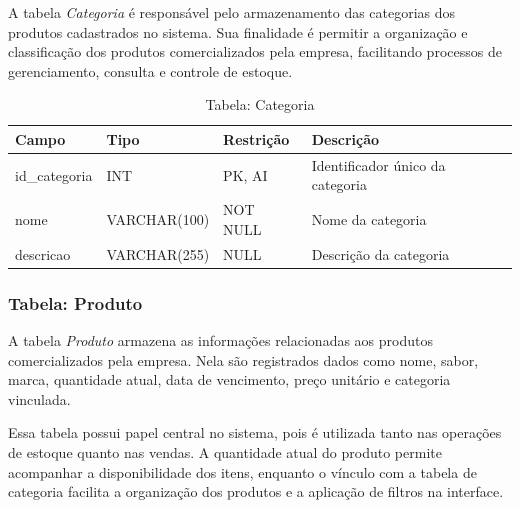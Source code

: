 A tabela \textit{Categoria} é responsável pelo armazenamento das categorias dos produtos cadastrados no sistema. Sua finalidade é permitir a organização e classificação dos produtos comercializados pela empresa, facilitando processos de gerenciamento, consulta e controle de estoque.

\begin{table}[H]
\centering
\begin{tabular}{|p{3cm}|p{3cm}|p{3cm}|p{5cm}|}
\hline
\textbf{Campo} & \textbf{Tipo} & \textbf{Restrição} & \textbf{Descrição} \\ \hline
id\_categoria & INT & PK, AI & Identificador único da categoria \\ \hline
nome & VARCHAR(100) & NOT NULL & Nome da categoria \\ \hline
descricao & VARCHAR(255) & NULL & Descrição da categoria \\ \hline
\end{tabular}
\caption{Tabela: Categoria}
\end{table}

\subsubsection{Tabela: Produto}

A tabela \textit{Produto} armazena as informações relacionadas aos produtos comercializados pela empresa. Nela são registrados dados como nome, sabor, marca, quantidade atual, data de vencimento, preço unitário e categoria vinculada.

Essa tabela possui papel central no sistema, pois é utilizada tanto nas operações de estoque quanto nas vendas. A quantidade atual do produto permite acompanhar a disponibilidade dos itens, enquanto o vínculo com a tabela de categoria facilita a organização dos produtos e a aplicação de filtros na interface.

